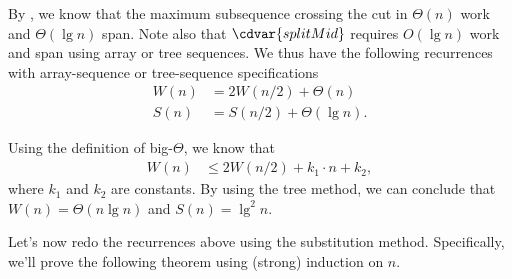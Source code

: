 \begin{gram}
%
%
By , we know that the maximum
subsequence crossing the cut in $\Theta(n)$ work and $\Theta(\lg{n})$
span.
%
Note also that $\cdvar{splitMid}$ requires  $O(\lg n)$ work and span using
array or tree sequences.
%
We thus have the following recurrences with array-sequence or
tree-sequence specifications
%
\begin{align*}
  W(n) &= 2W(n/2) + \Theta(n)\\
  S(n) &= S(n/2) +  \Theta(\lg n).
\end{align*}

Using the definition of big-$\Theta$, we know
that
\begin{align*}
  W(n) &\leq 2W(n/2) + k_1\cdot n + k_2,
\end{align*}
where $k_1$ and $k_2$ are constants.
%
By using the tree method, we can conclude that $W(n) = \Theta(n\lg{n})$ and
$S(n) = \lg^2{n}$.
%



\end{gram}

\begin{gram}
Let's now redo the recurrences above using the substitution method.
%
Specifically, we'll prove the following theorem using (strong)
induction on $n$.
%
\end{gram}

